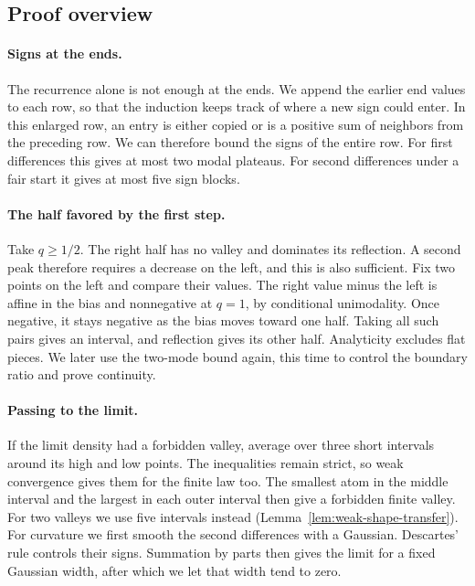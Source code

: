 \subsection{Proof overview}\label{sec:architecture}

\paragraph{Signs at the ends.}
The recurrence alone is not enough at the ends. We append the earlier
end values to each row, so that the induction keeps track of where a
new sign could enter. In this enlarged row, an entry is either copied
or is a positive sum of neighbors from the preceding row. We can
therefore bound the signs of the entire row. For first differences
this gives at most two modal plateaus. For second differences under
a fair start it gives at most five sign blocks.

\paragraph{The half favored by the first step.}
Take $q\ge1/2$. The right half has no valley and dominates its
reflection. A second peak therefore requires a decrease on the left,
and this is also sufficient. Fix two points on the left and compare
their values. The right value minus the left is affine in the bias
and nonnegative at $q=1$, by conditional unimodality. Once negative,
it stays negative as the bias moves toward one half. Taking all such
pairs gives an interval, and reflection gives its other half.
Analyticity excludes flat pieces. We later use the two-mode bound
again, this time to control the boundary ratio and prove continuity.

\paragraph{Passing to the limit.}
If the limit density had a forbidden valley, average over three short
intervals around its high and low points. The inequalities remain
strict, so weak convergence gives them for the finite law too.
The smallest atom in the middle interval and the largest in each
outer interval then give a forbidden finite valley.
For two valleys we use five intervals instead
(Lemma~\ref{lem:weak-shape-transfer}).
For curvature we first smooth the second differences with a Gaussian.
Descartes' rule controls their signs. Summation by parts then gives
the limit for a fixed Gaussian width, after which we let that width
tend to zero.

